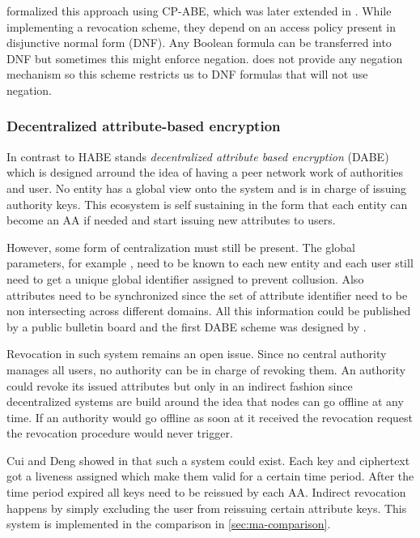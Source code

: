 \cite{Wang:2010:HAE:1866307.1866414} formalized this approach using \ac{CP-ABE}, which was later extended in \cite{wang2011hierarchical}. While implementing a revocation scheme, they depend on an access policy present in disjunctive normal form (\ac{DNF}). Any Boolean formula can be transferred into DNF but sometimes this might enforce negation. \cite{wang2011hierarchical} does not provide any negation mechanism so this scheme restricts us to DNF formulas that will not use negation.  

\subsubsection{Decentralized attribute-based encryption}
\label{sec:DABE}
In contrast to HABE stands \textit{decentralized attribute based encryption} (\ac{DABE}) which is designed arround the idea of having a peer network work of authorities and user. No entity has a global view onto the system and is in charge of issuing authority keys. This ecosystem is self sustaining in the form that each entity can become an \ac{AA} if needed and start issuing new attributes to users. 

However, some form of centralization must still be present. The global parameters, for example , need to be known to each new entity and each user still need to get a unique global identifier assigned to prevent collusion. Also attributes need to be synchronized since the set of attribute identifier need to be non intersecting across different domains. All this information could be published by a public bulletin board and the first DABE scheme was designed by \cite{lewko2011decentralizing}. 

Revocation in such system remains an open issue. Since no central authority manages all users, no authority can be in charge of revoking them. An authority could revoke its issued attributes but only in an indirect fashion since decentralized systems are build around the idea that nodes can go offline at any time. If an authority would go offline as soon at it received the revocation request the revocation procedure would never trigger. 

Cui and Deng showed in \cite{cui2016revocable} that such a system could exist. Each key and ciphertext got a liveness assigned which make them valid for a certain time period. After the time period expired all keys need to be reissued by each \ac{AA}. Indirect revocation happens by simply excluding the user from reissuing certain attribute keys. This system is implemented in the comparison in \ref{sec:ma-comparison}.

